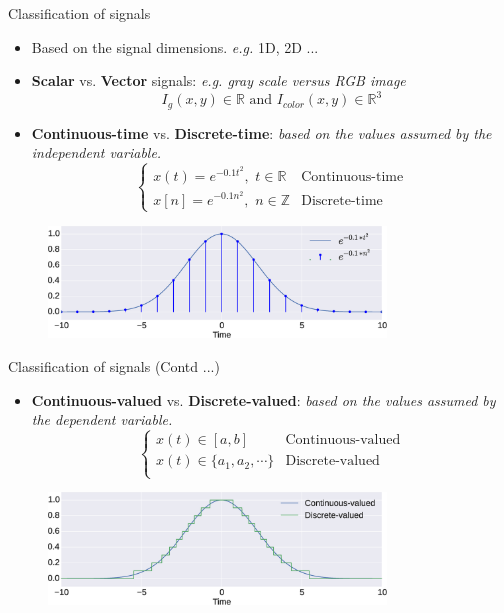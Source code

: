 \documentclass{beamer}
\begin{document}
\begin{frame}{Classification of signals}\
\begin{itemize}
\item Based on the signal dimensions. \textit{e.g.} 1D, 2D ...
\item \textbf{Scalar} vs. \textbf{Vector} signals: \textit{e.g. gray scale versus RGB image}
\[I_g\left(x,y\right) \in \mathbb{R} \,\,\mathrm{and}\,\, I_{color}\left(x,y\right) \in \mathbb{R}^3\]
\item \textbf{Continuous-time} vs. \textbf{Discrete-time}: \textit{based on the values assumed by the independent variable.}
\[
\begin{cases}
x(t) = e^{-0.1t^{2}}, \,\, t \in \mathbb{R} & \text{Continuous-time} \\
x[n] = e^{-0.1n^{2}}, \,\, n \in \mathbb{Z} & \text{Discrete-time}
\end{cases}
 \]
\end{itemize}
\begin{figure}
\includegraphics[width=0.8\textwidth]{img/cont_disc.eps}
\end{figure}
\end{frame}

\begin{frame}{Classification of signals (Contd ...)}
\begin{itemize}
\item \textbf{Continuous-valued} vs. \textbf{Discrete-valued}: \textit{based on the values assumed by the dependent variable.}
\[
\begin{cases}
x(t) \in [a, b] & \text{Continuous-valued} \\
x(t) \in \{a_1, a_2, \cdots\} & \text{Discrete-valued} \\
\end{cases}
 \]
\end{itemize}
\begin{figure}
\includegraphics[width=0.8\textwidth]{img/cont_disc_val.eps}
\end{figure}
\end{frame}
\end{document}

